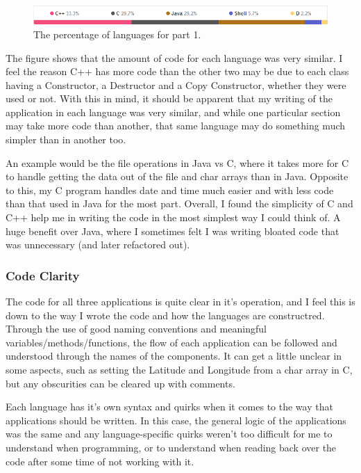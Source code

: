 \documentclass{article}
\begin{document}
\begin{figure}[h!]
  \centering
    \includegraphics[width=1\textwidth]{img/percentages}
  \caption{The percentage of languages for part 1.}
\end{figure}

The figure shows that the amount of code for each language was very similar. I feel the reason C++ has more code than the other two may be due to each class having a Constructor, a Destructor and a Copy Constructor, whether they were used or not. With this in mind, it should be apparent that my writing of the application in each language was very similar, and while one particular section may take more code than another, that same language may do something much simpler than in another too.

An example would be the file operations in Java vs C, where it takes more for C to handle getting the data out of the file and char arrays than in Java. Opposite to this, my C program handles date and time much easier and with less code than that used in Java for the most part. Overall, I found the simplicity of C and C++ help me in writing the code in the most simplest way I could think of. A huge benefit over Java, where I sometimes felt I was writing bloated code that was unnecessary (and later refactored out).

\subsubsection{Code Clarity}

The code for all three applications is quite clear in it's operation, and I feel this is down to the way I wrote the code and how the languages are constructred. Through the use of good naming conventions and meaningful variables/methods/functions, the flow of each application can be followed and understood through the names of the components. It can get a little unclear in some aspects, such as setting the Latitude and Longitude from a char array in C, but any obscurities can be cleared up with comments.

Each language has it's own syntax and quirks when it comes to the way that applications should be written. In this case, the general logic of the applications was the same and any language-specific quirks weren't too difficult for me to understand when programming, or to understand when reading back over the code after some time of not working with it.
\end{document}
